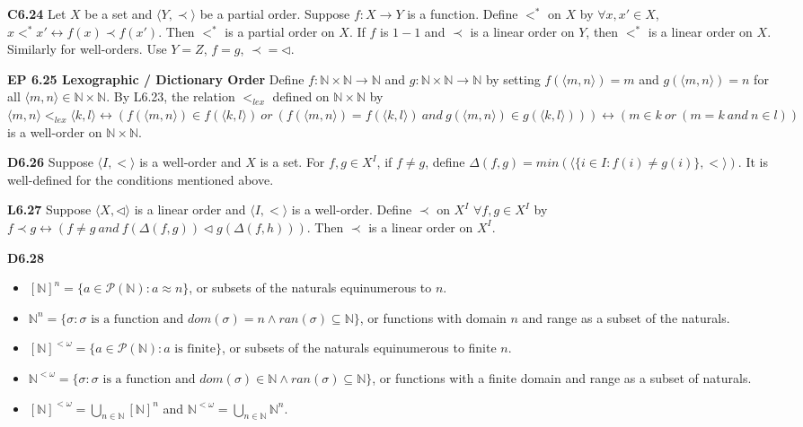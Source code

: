 \documentclass[10pt, landscape]{article}
\begin{document}
\begin{multicols*}{3}
\textbf{C6.24} Let $X$ be a set and $\langle Y, \prec \rangle$ be a partial order. Suppose $f: X \rightarrow Y$ is a function. Define $<^*$ on $X$ by $\forall x, x' \in X$, $x <^* x' \leftrightarrow f(x) \prec f(x')$. Then $<^*$ is a partial order on $X$. If $f$ is $1-1$ and $\prec$ is a linear order on $Y$, then $<^*$ is a linear order on $X$. Similarly for well-orders. Use $Y = Z$, $f = g$, $\prec=\lhd$.

\textbf{EP 6.25 Lexographic / Dictionary Order} Define $f : \mathbb{N} \times \mathbb{N} \rightarrow \mathbb{N}$ and $g : \mathbb{N} \times \mathbb{N} \rightarrow \mathbb{N}$ by setting $f(\langle m, n \rangle)=m$ and $g(\langle m, n \rangle)=n$ for all $\langle m, n \rangle \in \mathbb{N} \times \mathbb{N}$. By L6.23, the relation $<_{lex}$ defined on $\mathbb{N} \times \mathbb{N}$ by $\langle m, n \rangle <_{lex} \langle k, l \rangle \leftrightarrow (f(\langle m, n \rangle)  \in f(\langle k, l \rangle)\ or \ (f(\langle m, n \rangle) = f(\langle k, l \rangle) \ and \ g(\langle m, n \rangle)  \in g(\langle k, l \rangle))) \leftrightarrow (m \in k \ or \ (m = k \ and \ n \in l))$ is a well-order on $\mathbb{N} \times \mathbb{N}$.

\textbf{D6.26} Suppose $\langle I, < \rangle$ is a well-order and $X$ is a set. For $f, g \in X^I$, if $f \neq g$, define $\Delta(f, g) = min(\langle \{i \in I : f(i) \neq g(i)\}, <\rangle)$. It is well-defined for the conditions mentioned above.

\textbf{L6.27} Suppose $\langle X, \lhd \rangle$ is a linear order and $\langle I, < \rangle$ is a well-order. Define $\prec$ on $X^I$ $\forall f, g \in X^I$ by $f \prec g \leftrightarrow (f \neq g \ and \ f(\Delta(f, g)) \lhd g(\Delta(f, h)))$. Then $\prec$ is a linear order on $X^I$.

\textbf{D6.28}
\begin{itemize}
    \item $[\mathbb{N}]^n=\{a \in \mathcal{P}(\mathbb{N}) : a \approx n\}$, or subsets of the naturals equinumerous to $n$.
    \item $\mathbb{N}^n=\{\sigma : \sigma \text{ is a function and } dom(\sigma)=n \land ran(\sigma) \subseteq \mathbb{N}\}$, or functions with domain $n$ and range as a subset of the naturals.
    \item $[\mathbb{N}]^{<\omega}=\{a \in \mathcal{P}(\mathbb{N}): a \text{ is finite}\}$, or subsets of the naturals equinumerous to finite $n$.
    \item $\mathbb{N}^{<\omega} = \{\sigma : \sigma \text{ is a function and } dom(\sigma)\in \mathbb{N} \land ran(\sigma) \subseteq \mathbb{N}\}$, or functions with a finite domain and range as a subset of naturals.
    \item $[\mathbb{N}]^{<\omega}=\bigcup_{n \in \mathbb{N}}[\mathbb{N}]^n$ and $\mathbb{N}^{<\omega}=\bigcup_{n \in \mathbb{N}}\mathbb{N}^n$.
\end{itemize}


\end{multicols*}
\end{document}
